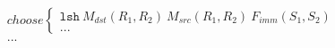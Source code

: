 \begin{align*}
&choose
\begin{cases}
  \texttt{lsh}\ M_{dst}(R_1, R_2)\ M_{src}(R_1, R_2)\ F_{imm}(S_1, S_2)\\
...
\end{cases}\\
&...\\
\end{align*}
